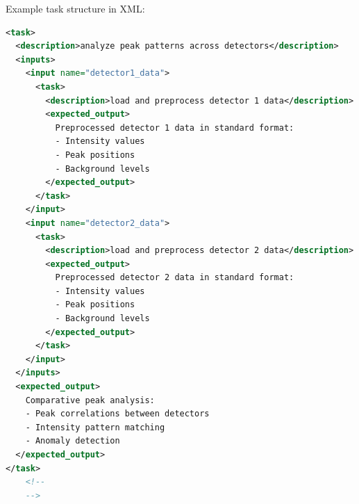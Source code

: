 \documentclass{article}
\begin{document}
%
%        
%
%        

Example task structure in XML:
\begin{lstlisting}[language=XML]
<task>
  <description>analyze peak patterns across detectors</description>
  <inputs>
    <input name="detector1_data">
      <task>
        <description>load and preprocess detector 1 data</description>
        <expected_output>
          Preprocessed detector 1 data in standard format:
          - Intensity values
          - Peak positions
          - Background levels
        </expected_output>
      </task>
    </input>
    <input name="detector2_data">
      <task>
        <description>load and preprocess detector 2 data</description>
        <expected_output>
          Preprocessed detector 2 data in standard format:
          - Intensity values
          - Peak positions
          - Background levels
        </expected_output>
      </task>
    </input>
  </inputs>
  <expected_output>
    Comparative peak analysis:
    - Peak correlations between detectors
    - Intensity pattern matching
    - Anomaly detection
  </expected_output>
</task>
    <!--
    -->
\end{lstlisting}
\end{document}
